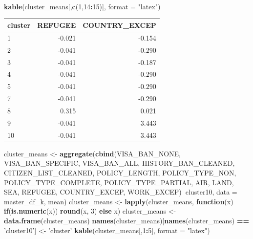 \documentclass[]{article}
\newenvironment{Shaded}{\begin{snugshade}}{\end{snugshade}}
\newcommand{\ControlFlowTok}[1]{\textcolor[rgb]{0.13,0.29,0.53}{\textbf{#1}}}
\newcommand{\DataTypeTok}[1]{\textcolor[rgb]{0.13,0.29,0.53}{#1}}
\newcommand{\DecValTok}[1]{\textcolor[rgb]{0.00,0.00,0.81}{#1}}
\newcommand{\KeywordTok}[1]{\textcolor[rgb]{0.13,0.29,0.53}{\textbf{#1}}}
\newcommand{\NormalTok}[1]{#1}
\newcommand{\OperatorTok}[1]{\textcolor[rgb]{0.81,0.36,0.00}{\textbf{#1}}}
\newcommand{\StringTok}[1]{\textcolor[rgb]{0.31,0.60,0.02}{#1}}
\begin{document}
\begin{Shaded}
\begin{Highlighting}[]
\KeywordTok{kable}\NormalTok{(cluster_means[,}\KeywordTok{c}\NormalTok{(}\DecValTok{1}\NormalTok{,}\DecValTok{14}\OperatorTok{:}\DecValTok{15}\NormalTok{)], }\DataTypeTok{format =} \StringTok{"latex"}\NormalTok{)}
\end{Highlighting}
\end{Shaded}

\begin{tabular}{l|r|r}
\hline
cluster & REFUGEE & COUNTRY\_EXCEP\\
\hline
1 & -0.021 & -0.154\\
\hline
2 & -0.041 & -0.290\\
\hline
3 & -0.041 & -0.187\\
\hline
4 & -0.041 & -0.290\\
\hline
5 & -0.041 & -0.290\\
\hline
7 & -0.041 & -0.290\\
\hline
8 & 0.315 & 0.021\\
\hline
9 & -0.041 & 3.443\\
\hline
10 & -0.041 & 3.443\\
\hline
\end{tabular}

\begin{Shaded}
\begin{Highlighting}[]
\NormalTok{cluster_means <-}\StringTok{ }\KeywordTok{aggregate}\NormalTok{(}\KeywordTok{cbind}\NormalTok{(VISA_BAN_NONE, VISA_BAN_SPECIFIC, VISA_BAN_ALL,}
\NormalTok{                HISTORY_BAN_CLEANED,}
\NormalTok{                CITIZEN_LIST_CLEANED, POLICY_LENGTH, POLICY_TYPE_NON, }
\NormalTok{                POLICY_TYPE_COMPLETE, POLICY_TYPE_PARTIAL,}
\NormalTok{                AIR, LAND, }
\NormalTok{                SEA, REFUGEE, COUNTRY_EXCEP, WORK_EXCEP)}\OperatorTok{~}\NormalTok{cluster10, }\DataTypeTok{data =}\NormalTok{ master_df_k, mean)}
\NormalTok{cluster_means <-}\StringTok{ }\KeywordTok{lapply}\NormalTok{(cluster_means, }\ControlFlowTok{function}\NormalTok{(x) }\ControlFlowTok{if}\NormalTok{(}\KeywordTok{is.numeric}\NormalTok{(x)) }\KeywordTok{round}\NormalTok{(x, }\DecValTok{3}\NormalTok{) }\ControlFlowTok{else}\NormalTok{ x)}
\NormalTok{cluster_means <-}\StringTok{ }\KeywordTok{data.frame}\NormalTok{(cluster_means)}
\KeywordTok{names}\NormalTok{(cluster_means)[}\KeywordTok{names}\NormalTok{(cluster_means) }\OperatorTok{==}\StringTok{ 'cluster10'}\NormalTok{] <-}\StringTok{ 'cluster'}
\KeywordTok{kable}\NormalTok{(cluster_means[,}\DecValTok{1}\OperatorTok{:}\DecValTok{5}\NormalTok{], }\DataTypeTok{format =} \StringTok{"latex"}\NormalTok{)}
\end{Highlighting}
\end{Shaded}
\end{document}
